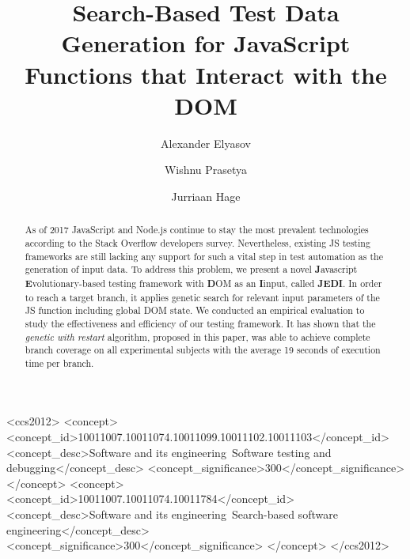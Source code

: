 \documentclass[sigconf,review,anonymous]{acmart}
\begin{document}
\title[Search-Based Test Data Generation for JavaScript Functions...]{Search-Based Test Data Generation for JavaScript Functions that Interact with the DOM}


\author{Alexander Elyasov}

\author{Wishnu Prasetya}

\author{Jurriaan Hage}


\begin{abstract}
As of 2017 JavaScript and Node.js continue to stay the most prevalent technologies according to the Stack Overflow developers survey. Nevertheless, existing JS testing frameworks are still lacking any support for such a vital step in test automation as the generation of input data. To address this problem, we present a novel \textbf{J}avascript \textbf{E}volutionary-based testing framework with \textbf{D}OM as an \textbf{I}input, called \textbf{JEDI}. In order to reach a target branch, it applies genetic search for relevant input parameters of the JS function including global DOM state. We conducted an empirical evaluation to study the effectiveness and efficiency of our testing framework.
 It has shown that the \emph{genetic with restart} algorithm, proposed in this paper, was able to achieve complete branch coverage on all experimental subjects with the average 19 seconds of execution time per branch.
\end{abstract}

%
%
\begin{CCSXML}
<ccs2012>
<concept>
<concept_id>10011007.10011074.10011099.10011102.10011103</concept_id>
<concept_desc>Software and its engineering~Software testing and debugging</concept_desc>
<concept_significance>300</concept_significance>
</concept>
<concept>
<concept_id>10011007.10011074.10011784</concept_id>
<concept_desc>Software and its engineering~Search-based software engineering</concept_desc>
<concept_significance>300</concept_significance>
</concept>
</ccs2012>
\end{CCSXML}

\end{document}
